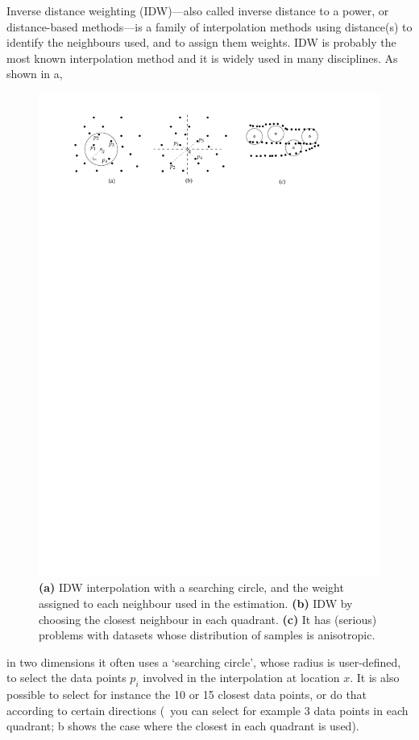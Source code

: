 Inverse distance weighting (IDW)---also called inverse distance to a power, or distance-based methods---is a family of interpolation methods using distance(s) to identify the neighbours used, and to assign them weights.
IDW is probably the most known interpolation method and it is widely used in many disciplines.
As shown in a,
\begin{figure}
  \centering
  \includegraphics[width=\textwidth]{figs/idw}
  \caption{\textbf{(a)} IDW interpolation with a searching circle, and the weight assigned to each neighbour used in the estimation. \textbf{(b)} IDW by choosing the closest neighbour in each quadrant. \textbf{(c)} It has (serious) problems with datasets whose distribution of samples is anisotropic.} %
\end{figure}
in two dimensions it often uses a `searching circle', whose radius is user-defined, to select the data points $p_i$ involved in the interpolation at location $x$. 
It is also possible to select for instance the 10 or 15 closest data points, or do that according to certain directions (\ie\ you can select for example 3 data points in each quadrant; b shows the case where the closest in each quadrant is used). 

